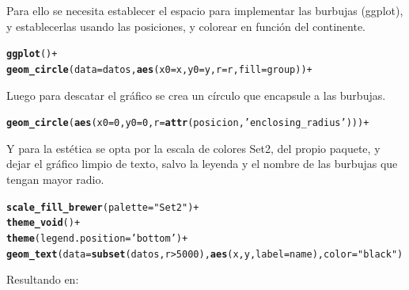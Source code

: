 \documentclass{article}\usepackage[]{graphicx}\usepackage[]{color}
\makeatletter
\newcommand{\hlnum}[1]{\textcolor[rgb]{0.686,0.059,0.569}{#1}}%
\newcommand{\hlstr}[1]{\textcolor[rgb]{0.192,0.494,0.8}{#1}}%
\newcommand{\hlopt}[1]{\textcolor[rgb]{0,0,0}{#1}}%
\newcommand{\hlstd}[1]{\textcolor[rgb]{0.345,0.345,0.345}{#1}}%
\newcommand{\hlkwc}[1]{\textcolor[rgb]{0.333,0.667,0.333}{#1}}%
\newcommand{\hlkwd}[1]{\textcolor[rgb]{0.737,0.353,0.396}{\textbf{#1}}}%
\newenvironment{kframe}{%
 \def\at@end@of@kframe{}%
 \ifinner\ifhmode%
  \def\at@end@of@kframe{\end{minipage}}%
  \begin{minipage}{\columnwidth}%
 \fi\fi%
 \def\FrameCommand##1{\hskip\@totalleftmargin \hskip-\fboxsep
 \colorbox{shadecolor}{##1}\hskip-\fboxsep
     \hskip-\linewidth \hskip-\@totalleftmargin \hskip\columnwidth}%
 \MakeFramed {\advance\hsize-\width
   \@totalleftmargin\z@ \linewidth\hsize
   \@setminipage}}%
 {\par\unskip\endMakeFramed%
 \at@end@of@kframe}
\newenvironment{knitrout}{}{} %
\makeatother
\begin{document}
Para ello se necesita establecer el espacio para implementar las burbujas (ggplot), y establecerlas usando las posiciones, y colorear en funci\'on del continente.
\begin{knitrout}
\color{fgcolor}\begin{kframe}
\begin{alltt}
\hlkwd{ggplot}() +
  \hlkwd{geom_circle}(data=datos, \hlkwd{aes}(x0 = x, y0 = y, r = r, fill = group)) +
\end{alltt}
\end{kframe}
\end{knitrout}
\clearpage
Luego para descatar el gr\'afico se crea un c\'irculo que encapsule a las burbujas.
\begin{knitrout}
\color{fgcolor}\begin{kframe}
\begin{alltt}
  \hlkwd{geom_circle}(\hlkwd{aes}(x0 = 0, y0 = 0, r = \hlkwd{attr}(posicion, \hlstr{'enclosing_radius'}))) +
\end{alltt}
\end{kframe}
\end{knitrout}
Y para la est\'etica se opta por la escala de colores Set2, del propio paquete, y dejar el gr\'afico limpio de texto, salvo la leyenda y el nombre de las burbujas que tengan mayor radio.
\begin{knitrout}
\color{fgcolor}\begin{kframe}
\begin{alltt}
  \hlkwd{scale_fill_brewer}\hlstd{(}\hlkwc{palette} \hlstd{=} \hlstr{"Set2"}\hlstd{)} \hlopt{+}
  \hlkwd{theme_void}\hlstd{()} \hlopt{+}
  \hlkwd{theme}\hlstd{(}\hlkwc{legend.position} \hlstd{=} \hlstr{'bottom'}\hlstd{)}\hlopt{+}
  \hlkwd{geom_text}\hlstd{(}\hlkwc{data} \hlstd{=} \hlkwd{subset}\hlstd{(datos, r} \hlopt{>} \hlnum{5000}\hlstd{),} \hlkwd{aes}\hlstd{(x,y,}\hlkwc{label}\hlstd{=name),} \hlkwc{color} \hlstd{=} \hlstr{"black"}\hlstd{)}
\end{alltt}
\end{kframe}
\end{knitrout}
Resultando en: 
\end{document}
